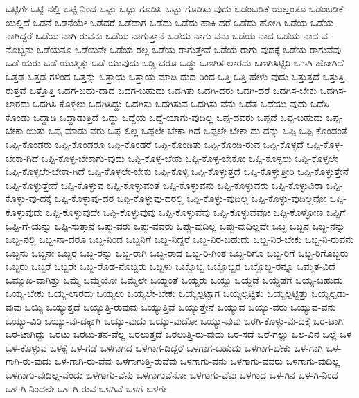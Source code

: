 {ಒಟ್ಟಿಗೇ
ಒಟ್ಟಿ-ನಲ್ಲಿ
ಒಟ್ಟಿ-ನಿಂದ
ಒಟ್ಟು
ಒಟ್ಟು-ಗೂಡಿಸಿ
ಒಟ್ಟು-ಗೂಡಿಸು-ವುದು
ಒಡಂಬಡಿಕೆ-ಯಲ್ಲಂತೂ
ಒಡಂಬಡಿಕೆ-ಯಲ್ಲಿದೆ
ಒಡನೆ
ಒಡನೆಯೇ
ಒಡೆದರೆ
ಒಡೆದಾಗ
ಒಡೆದು
ಒಡೆದು-ಹಾಕಿ-ದರೆ
ಒಡೆದು-ಹೋಗಿ
ಒಡೆಯ
ಒಡೆಯ-ನಾಗಿದ್ದರೆ
ಒಡೆಯ-ನಾಗಿ-ರುವನು
ಒಡೆಯ-ನಾಗುತ್ತಾನೆ
ಒಡೆಯ-ನಾಗು-ವನು
ಒಡೆಯ-ನಾದ
ಒಡೆಯ-ನಾದ-ವ-ನೊಬ್ಬನು
ಒಡೆಯನೂ
ಒಡೆಯನೇ
ಒಡೆಯ-ರಲ್ಲ
ಒಡೆಯ-ರಾಗುತ್ತೇವೆ
ಒಡೆಯ-ರಾಗು-ವುದಕ್ಕೆ
ಒಡೆಯ-ರಾಗುವೆವು
ಒಡೆ-ಯರು
ಒಡೆ-ಯುತ್ತಿತ್ತು
ಒಡೆ-ಯುವುದು
ಒಡ್ಡಿ-ದರೂ
ಒಡ್ಡು
ಒಣಗಿಸ-ಲಾರದು
ಒಣಗಿಸಿಟ್ಟಿರಿ
ಒಣಗಿ-ಹೋಗಿದೆ
ಒತ್ತಡ
ಒತ್ತಡ-ಗಳಿಂದ
ಒತ್ತನ್ನು
ಒತ್ತಾಯ
ಒತ್ತಾಯ-ಮಾಡಿ-ದುದ-ರಿಂದ
ಒತ್ತಿ
ಒತ್ತಿ-ಹೇಳು-ವುದು
ಒತ್ತುತ್ತದೆ
ಒತ್ತುತ್ತಿ-ರುತ್ತವೆ
ಒತ್ತೊತ್ತಿ
ಒದಗ-ಬಹು-ದಾದ
ಒದಗ-ಬಹುದು
ಒದಗಿತು
ಒದಗಿ-ದರು
ಒದಗಿ-ದರೆ
ಒದಗಿಸ-ಬೇಕು
ಒದಗಿಸ-ಲಾರದು
ಒದಗಿಸಿ-ಕೊಳ್ಳಲು
ಒದಗಿಸಿದ್ದು
ಒದಗಿಸು
ಒದಗಿಸುವ
ಒದಗಿಸು-ವೆನು
ಒದೆತ
ಒದೆಯು-ವುದು
ಒದೆಸಿ-ಕೊಂಡು
ಒದ್ದಾಡಿ
ಒದ್ದಾಡುತ್ತಿದೆ
ಒದ್ದು
ಒದ್ದೆಯ
ಒದ್ದೆ-ಯಾಗು-ವುದಿಲ್ಲ
ಒಪ್ಪ-ದವರು
ಒಪ್ಪದೆ
ಒಪ್ಪ-ಬಹುದು
ಒಪ್ಪ-ಬೇಕಾ-ಯಿತು
ಒಪ್ಪ-ಮಾಡು-ವರು
ಒಪ್ಪ-ಲಿಲ್ಲ
ಒಪ್ಪಲೇ-ಬೇಕಾ-ಗಿದೆ
ಒಪ್ಪಲೇ-ಬೇಕಾ-ದು-ದನ್ನು
ಒಪ್ಪಿ
ಒಪ್ಪಿ-ಕೊಂಡಂತೆ
ಒಪ್ಪಿ-ಕೊಂಡರು
ಒಪ್ಪಿ-ಕೊಂಡರೂ
ಒಪ್ಪಿ-ಕೊಂಡರೆ
ಒಪ್ಪಿ-ಕೊಂಡಿತು
ಒಪ್ಪಿ-ಕೊಂಡಿ-ರುವ
ಒಪ್ಪಿ-ಕೊಳ್ಳದೆ
ಒಪ್ಪಿ-ಕೊಳ್ಳ-ಬೇಕಾ-ಗಿದೆ
ಒಪ್ಪಿ-ಕೊಳ್ಳ-ಬೇಕಾಗು-ವುದು
ಒಪ್ಪಿ-ಕೊಳ್ಳ-ಬೇಕು
ಒಪ್ಪಿ-ಕೊಳ್ಳ-ಬೇಕೋ
ಒಪ್ಪಿ-ಕೊಳ್ಳಲು
ಒಪ್ಪಿ-ಕೊಳ್ಳಲೇ
ಒಪ್ಪಿ-ಕೊಳ್ಳಲೇ-ಬೇಕಾ-ಗಿದೆ
ಒಪ್ಪಿ-ಕೊಳ್ಳಲೇ-ಬೇಕು
ಒಪ್ಪಿ-ಕೊಳ್ಳಿ
ಒಪ್ಪಿ-ಕೊಳ್ಳುತ್ತದೆ
ಒಪ್ಪಿ-ಕೊಳ್ಳುತ್ತೀರಿ
ಒಪ್ಪಿ-ಕೊಳ್ಳುತ್ತೇನೆ
ಒಪ್ಪಿ-ಕೊಳ್ಳುತ್ತೇವೆ
ಒಪ್ಪಿ-ಕೊಳ್ಳುವ
ಒಪ್ಪಿ-ಕೊಳ್ಳುವಂತೆ
ಒಪ್ಪಿ-ಕೊಳ್ಳುವನು
ಒಪ್ಪಿ-ಕೊಳ್ಳುವರು
ಒಪ್ಪಿ-ಕೊಳ್ಳುವಿರಾ
ಒಪ್ಪಿ-ಕೊಳ್ಳು-ವು-ದಕ್ಕೆ
ಒಪ್ಪಿ-ಕೊಳ್ಳುವು-ದರ
ಒಪ್ಪಿ-ಕೊಳ್ಳುವು-ದರಲ್ಲಿ
ಒಪ್ಪಿ-ಕೊಳ್ಳು-ವುದಿಲ್ಲ
ಒಪ್ಪಿ-ಕೊಳ್ಳು-ವುದಿಲ್ಲವೋ
ಒಪ್ಪಿ-ಕೊಳ್ಳುವುದು
ಒಪ್ಪಿ-ಕೊಳ್ಳುವುದೇ
ಒಪ್ಪಿ-ಕೊಳ್ಳುವುವು
ಒಪ್ಪಿ-ಕೊಳ್ಳುವೆವು
ಒಪ್ಪಿ-ಕೊಳ್ಳುವೆವೋ
ಒಪ್ಪಿ-ಕೊಳ್ಳೋಣ
ಒಪ್ಪಿಗೆ
ಒಪ್ಪಿ-ಗೆ-ಯನ್ನು
ಒಪ್ಪಿ-ಸುತ್ತಾನೆ
ಒಪ್ಪು-ವರು
ಒಪ್ಪು-ವವರು
ಒಪ್ಪು-ವುದಿಲ್ಲ
ಒಪ್ಪು-ವುದಿಲ್ಲವೇ
ಒಬ್ಬ
ಒಬ್ಬನ
ಒಬ್ಬ-ನನ್ನು
ಒಬ್ಬ-ನಲ್ಲಿ
ಒಬ್ಬ-ನಾ-ದರೂ
ಒಬ್ಬ-ನಿಂದ
ಒಬ್ಬನಿಗೆ
ಒಬ್ಬ-ನಿದ್ದರೆ
ಒಬ್ಬ-ನಿರ-ಬಹುದು
ಒಬ್ಬ-ನಿರ-ಬೇಕು
ಒಬ್ಬ-ನಿ-ರುವನು
ಒಬ್ಬನು
ಒಬ್ಬನೇ
ಒಬ್ಬರ
ಒಬ್ಬ-ರನ್ನು
ಒಬ್ಬ-ರಾಗಿ
ಒಬ್ಬ-ರಾದ
ಒಬ್ಬ-ರಿ-ಗಿಂತ
ಒಬ್ಬ-ರಿಗೂ
ಒಬ್ಬ-ರಿಗೆ
ಒಬ್ಬ-ರಿಗೊಬ್ಬರು
ಒಬ್ಬರು
ಒಬ್ಬರೆ
ಒಬ್ಬರೇ
ಒಬ್ಬ-ರೊಡ-ನೊಬ್ಬರು
ಒಬ್ಬಳು
ಒಬ್ಬೊಬ್ಬ
ಒಬ್ಬೊಬ್ಬರ
ಒಬ್ಬೊಬ್ಬ-ರನ್ನೂ
ಒಮ್ಮತ-ವಿದೆ
ಒಮ್ಮುಖ-ವಾಗಿತ್ತು
ಒಮ್ಮೆ
ಒಮ್ಮೆಯೋ
ಒಮ್ಮೆಲೇ
ಒಯ್ದಂತೆ
ಒಯ್ದರು
ಒಯ್ದು
ಒಯ್ದೆಡೆ
ಒಯ್ದೆಡೆಗೆ
ಒಯ್ಯ-ಬಹುದು
ಒಯ್ಯ-ಬೇಕು
ಒಯ್ಯ-ಲಾರದು
ಒಯ್ಯಲು
ಒಯ್ಯಲೇ-ಬೇಕು
ಒಯ್ಯಲ್ಪಟ್ಟಾಗ
ಒಯ್ಯಲ್ಪಟ್ಟಿತು
ಒಯ್ಯಲ್ಪಟ್ಟಿತ್ತು
ಒಯ್ಯಲ್ಪಡು-ವುವು
ಒಯ್ಯಿ
ಒಯ್ಯುತ್ತದೆ
ಒಯ್ಯುತ್ತಿ-ರುವುವು
ಒಯ್ಯುತ್ತಿವೆ
ಒಯ್ಯುತ್ತೇನೆ
ಒಯ್ಯುವ
ಒಯ್ಯು-ವರು
ಒಯ್ಯುವ-ವನು
ಒಯ್ಯು-ವಿರಿ
ಒಯ್ಯು-ವು-ದಕ್ಕಾಗಿ
ಒಯ್ಯು-ವುದು
ಒಯ್ಯು-ವುದೋ
ಒಯ್ಯು-ವುವು
ಒರಗಿ-ಕೊಳ್ಳು-ವು-ದಕ್ಕೆ
ಒರ-ಟಾಗಿ
ಒರ-ಟಾಗಿದ್ದು
ಒರಟು
ಒರಟು-ತನ-ವೆಲ್ಲ
ಒರಲುತ್ತದೆ
ಒರಲುತ್ತಿ-ರು-ವುದು
ಒರ-ಸದೆ
ಒರೆ-ಗಲ್ಲು
ಒಲ-ವಿನ
ಒಲ್ಲೆ
ಒಳ
ಒಳ-ಕೊಳ್ಳುವ
ಒಳಕ್ಕೆ
ಒಳ-ಗಡೆ
ಒಳಗಾಗದ
ಒಳಗಾಗ-ದಿದ್ದರೆ
ಒಳಗಾಗ-ಬಹುದು
ಒಳಗಾಗ-ಬೇಕು
ಒಳ-ಗಾಗಿ
ಒಳ-ಗಾಗಿ-ರು-ವುದು
ಒಳ-ಗಾಗಿ-ರು-ವೆವು
ಒಳಗಾಗುತ್ತಿ-ರುವೆವು
ಒಳಗಾಗು-ವನು
ಒಳಗಾಗು-ವವರು
ಒಳಗಾಗು-ವುದಿಲ್ಲ
ಒಳಗಾಗು-ವುದಿಲ್ಲ-ವೆಂದು
ಒಳಗಾಗು-ವೆನು
ಒಳಗಾಗುವೆನೋ
ಒಳಗಾಗು-ವೆವು
ಒಳಗಾದ
ಒಳ-ಗಿನ
ಒಳ-ಗಿ-ನಿಂದ
ಒಳ-ಗಿ-ನಿಂದಲೇ
ಒಳ-ಗಿ-ರುವ
ಒಳಗಿವೆ
ಒಳಗೆ
ಒಳಗೇ
}
